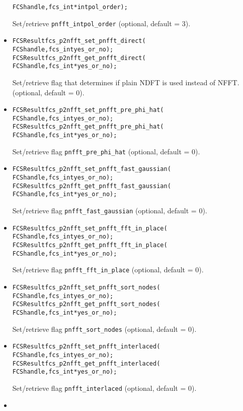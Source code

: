 \begin{itemize}
\begin{alltt}
    FCS handle, fcs_int* intpol_order);
\end{alltt}
    Set/retrieve \verb!pnfft_intpol_order! (optional, default = 3).
  \item
\begin{alltt}
FCSResult fcs_p2nfft_set_pnfft_direct(
    FCS handle, fcs_int yes_or_no);
FCSResult fcs_p2nfft_get_pnfft_direct(
    FCS handle, fcs_int* yes_or_no);
\end{alltt}
    Set/retrieve flag that determines if plain NDFT is used instead of NFFT.
    (optional, default = 0).
  \item
\begin{alltt}
FCSResult fcs_p2nfft_set_pnfft_pre_phi_hat(
    FCS handle, fcs_int yes_or_no);
FCSResult fcs_p2nfft_get_pnfft_pre_phi_hat(
    FCS handle, fcs_int* yes_or_no);
\end{alltt}
    Set/retrieve flag \verb!pnfft_pre_phi_hat! (optional, default = 0).
  \item
\begin{alltt}
FCSResult fcs_p2nfft_set_pnfft_fast_gaussian(
    FCS handle, fcs_int yes_or_no);
FCSResult fcs_p2nfft_get_pnfft_fast_gaussian(
    FCS handle, fcs_int* yes_or_no);
\end{alltt}
    Set/retrieve flag \verb!pnfft_fast_gaussian! (optional, default = 0).
  \item
\begin{alltt}
FCSResult fcs_p2nfft_set_pnfft_fft_in_place(
    FCS handle, fcs_int yes_or_no);
FCSResult fcs_p2nfft_get_pnfft_fft_in_place(
    FCS handle, fcs_int* yes_or_no);
\end{alltt}
    Set/retrieve flag \verb!pnfft_fft_in_place! (optional, default = 0).
  \item
\begin{alltt}
FCSResult fcs_p2nfft_set_pnfft_sort_nodes(
    FCS handle, fcs_int yes_or_no);
FCSResult fcs_p2nfft_get_pnfft_sort_nodes(
    FCS handle, fcs_int* yes_or_no);
\end{alltt}
    Set/retrieve flag \verb!pnfft_sort_nodes! (optional, default = 0).
  \item
\begin{alltt}
FCSResult fcs_p2nfft_set_pnfft_interlaced(
    FCS handle, fcs_int yes_or_no);
FCSResult fcs_p2nfft_get_pnfft_interlaced(
    FCS handle, fcs_int* yes_or_no);
\end{alltt}
    Set/retrieve flag \verb!pnfft_interlaced! (optional, default = 0).
  \item
\begin{alltt}

\end{alltt}
\end{itemize}
